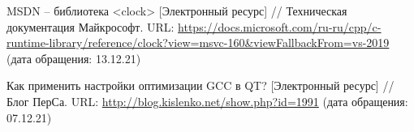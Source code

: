 
%


\begin{thebibliography}{3}	
	MSDN -- библиотека <clock> [Электронный ресурс] //
	Техническая документация Майкрософт.
	URL: \url{https://docs.microsoft.com/ru-ru/cpp/c-runtime-library/reference/clock?view=msvc-160&viewFallbackFrom=vs-2019}
	(дата обращения: 13.12.21)
	
	Как применить настройки оптимизации GCC в QT? [Электронный ресурс] //
	Блог ПерСа.
	URL:
	\url{http://blog.kislenko.net/show.php?id=1991}
	(дата обращения: 07.12.21)
\end{thebibliography}